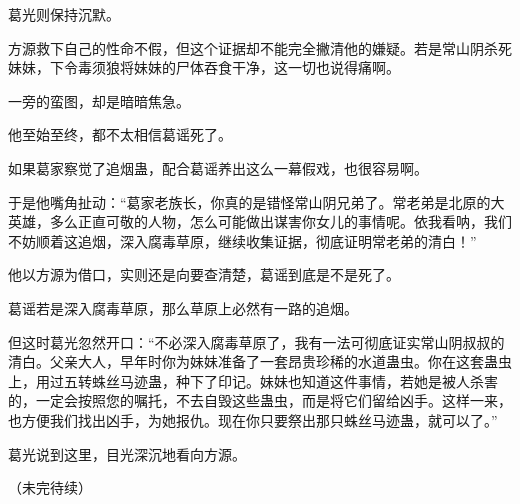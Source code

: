\begin{this_body}
葛光则保持沉默。

方源救下自己的性命不假，但这个证据却不能完全撇清他的嫌疑。若是常山阴杀死妹妹，下令毒须狼将妹妹的尸体吞食干净，这一切也说得痛啊。

一旁的蛮图，却是暗暗焦急。

他至始至终，都不太相信葛谣死了。

如果葛家察觉了追烟蛊，配合葛谣养出这么一幕假戏，也很容易啊。

于是他嘴角扯动：“葛家老族长，你真的是错怪常山阴兄弟了。常老弟是北原的大英雄，多么正直可敬的人物，怎么可能做出谋害你女儿的事情呢。依我看呐，我们不妨顺着这追烟，深入腐毒草原，继续收集证据，彻底证明常老弟的清白！”

他以方源为借口，实则还是向要查清楚，葛谣到底是不是死了。

葛谣若是深入腐毒草原，那么草原上必然有一路的追烟。

但这时葛光忽然开口：“不必深入腐毒草原了，我有一法可彻底证实常山阴叔叔的清白。父亲大人，早年时你为妹妹准备了一套昂贵珍稀的水道蛊虫。你在这套蛊虫上，用过五转蛛丝马迹蛊，种下了印记。妹妹也知道这件事情，若她是被人杀害的，一定会按照您的嘱托，不去自毁这些蛊虫，而是将它们留给凶手。这样一来，也方便我们找出凶手，为她报仇。现在你只要祭出那只蛛丝马迹蛊，就可以了。”

葛光说到这里，目光深沉地看向方源。

（未完待续）

\end{this_body}

